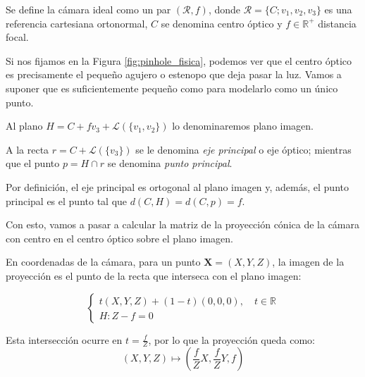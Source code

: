 \documentclass[
10pt, %
a4paper, %
oneside, %
headinclude,footinclude, %
BCOR=5mm, %
]{scrartcl}
\begin{document}
\begin{definition}
    Se define la cámara ideal como un par $(\mathcal{R}, f)$, donde $\mathcal{R} = \{C; v_1, v_2, v_3\}$ es una referencia cartesiana ortonormal, $C$ se denomina centro óptico y $f \in \mathbb{R}^+$ distancia focal. 
\end{definition}
\vspace{2ex}

\begin{observacion}
    Si nos fijamos en la Figura \ref{fig:pinhole_fisica}, podemos ver que el centro óptico es precisamente el pequeño agujero o estenopo que deja pasar la luz. Vamos a suponer que es suficientemente pequeño como para modelarlo como un único punto.
\end{observacion}

\begin{definition}
    Al plano $H = C + fv_3 + \mathcal{L}(\{v_1, v_2\})$ lo denominaremos plano imagen.
\end{definition}
\vspace{2ex}

\begin{definition}
    A la recta $r = C + \mathcal{L}(\{v_3\})$ se le denomina \textit{eje principal} o eje óptico; mientras que el punto $p = H \cap r$ se denomina \textit{punto principal}.
\end{definition}
\vspace{2ex}

\begin{observacion}
    Por definición, el eje principal es ortogonal al plano imagen y, además, el punto principal es el punto tal que $d(C, H) = d(C, p) = f$.
\end{observacion}

Con esto, vamos a pasar a calcular la matriz de la proyección cónica de la cámara con centro en el centro óptico sobre el plano imagen.

En coordenadas de la cámara, para un punto $\mathbf{X}=(X, Y, Z)$, la imagen de la proyección es el punto de la recta que interseca con el plano imagen:

\[
\begin{cases}
    t(X, Y, Z) + (1-t)(0,0,0), \quad t \in \mathbb{R} \\
    H: Z - f = 0
\end{cases}
\]

Esta intersección ocurre en $t = \frac{f}{Z}$, por lo que la proyección queda como:
\[
    (X, Y, Z) \longmapsto \left( \frac{f}{Z} X, \frac{f}{Z} Y, f \right)
\]
\end{document}
